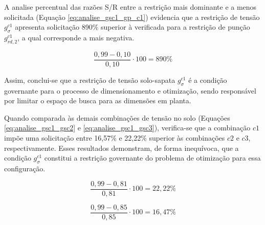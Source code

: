A analise percentual das razões S/R entre a restrição mais dominante e a menos solicitada (Equação \eqref{eq:analise_gsc1_gp_c1}) evidencia que a restrição de tensão $g_{\sigma}^{c1}$ apresenta solicitação 890\% superior à verificada para a restrição de punção $g_{rd,2}^{c1}$, a qual corresponde a mais negativa. 



\begin{equation}
    \label{eq:analise_gsc1_gp_c1}
    \frac{0,99-0,10}{0,10} \cdot 100 = 890\%
\end{equation}

Assim, conclui-se que a restrição de tensão solo-sapata $g_{\sigma}^{c1}$ é a condição governante para o processo de dimensionamento e otimização, sendo responsável por limitar o espaço de busca para as dimensões em planta.

Quando comparada às demais combinações de tensão no solo (Equações \eqref{eq:analise_gsc1_gsc2} e \eqref{eq:analise_gsc1_gsc3}), verifica-se que a combinação $c1$ impõe uma solicitação entre 16,57\% e 22,22\% superior às combinações $c2$ e $c3$, respectivamente. Esses resultados demonstram, de forma inequívoca, que a condição $g_{\sigma}^{c1}$ constitui a restrição governante do problema de otimização para essa configuração.

\begin{equation}
    \label{eq:analise_gsc1_gsc2}
    \frac{0,99-0,81}{0,81} \cdot 100 = 22,22 \%
\end{equation}

\begin{equation}
    \label{eq:analise_gsc1_gsc3}
    \frac{0,99-0,85}{0,85} \cdot 100 = 16,47\%
\end{equation}



\label{item:tres_elemento}

